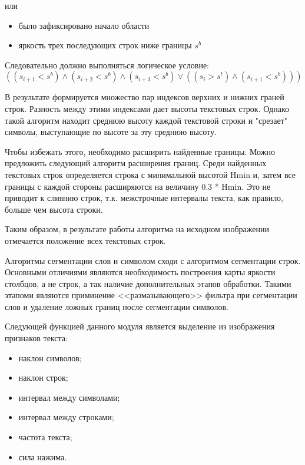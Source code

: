 или

\begin{itemize}
   \item было зафиксировано начало области
   \item яркость трех последующих строк ниже границы $ s^{b} $
\end{itemize}

Следовательно должно выполняться логическое условие:
\begin{displaymath}((s_{i+1} < s^{b}) \wedge (s_{i+2} < s^{b}) \wedge (s_{i+3} < s^{b}) \vee ((s_i > s^{t}) \wedge (s_{i+1} < s^{b})))\end{displaymath}

В результате формируется множество пар индексов верхних и нижних граней строк. Разность между этими индексами дает высоты текстовых строк. Однако такой алгоритм находит среднюю высоту каждой текстовой строки и "срезает" символы, выступающие по высоте за эту среднюю высоту.

Чтобы избежать этого, необходимо расширить найденные границы. Можно предложить следующий алгоритм расширения границ. Среди найденных текстовых строк определяется строка с минимальной высотой Hmin и, затем все границы с каждой стороны расширяются на величину 0.3 * Hmin. Это не приводит к слиянию строк, т.к. межстрочные интервалы текста, как правило, больше чем высота строки.
 
Таким образом, в результате работы алгоритма на исходном изображении отмечается положение всех текстовых строк.  

Алгоритмы сегментации слов и символом сходи с алгоритмом сегментации строк. Основными отличиями являются необходимость построения карты яркости столбцов, а не строк, а так наличие дополнительных этапов обработки. Такими этапоми являются приминение <<размазывающего>> фильтра при сегментации слов и удаление ложных границ после сегментации символов. 

Следующей функцией данного модуля является выделение из изображения признаков текста:
\begin{itemize}
  \item наклон символов;
  \item наклон строк;
  \item интервал между символами;
  \item интервал между строками;
  \item частота текста;
  \item сила нажима.
\end{itemize}

